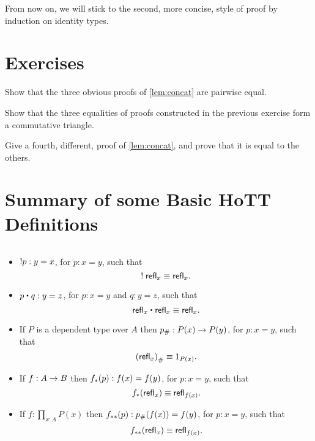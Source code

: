 From now on, we will stick to the second, more concise, style of proof by induction on identity types.


\section*{Exercises}
\label{basics:exercises}

\begin{ex}\label{ex:basics:concat}
  Show that the three obvious proofs of \autoref{lem:concat} are pairwise equal.
\end{ex}

\begin{ex}
  Show that the three equalities of proofs constructed in the previous exercise form a commutative triangle.
\end{ex}

\begin{ex}
  Give a fourth, different, proof of \autoref{lem:concat}, and prove that it is equal to the others.
\end{ex}
\section{Summary of  some Basic HoTT Definitions}
\begin{defn} $\;$
\begin{itemize}
\item $\mathord{!{p}} : y=x$, for $p:x=y$, such that 
  \[\mathord{!{\;\mathsf{refl}_{x}}}\equiv \mathsf{refl}_{x}.\]
\item $p\ct q :y=z$, for $p:x=y$ and $q:y=z$, such that 
  \[ \refl{x}\ct\refl{x}\jdeq\refl{x}.\]
\item If $P$ is a dependent type over $A$ then ${p}_{\#}:P(x)\rightarrow P(y)$, for $p:x=y$, such that 
  \[{(\mathsf{refl}_{x})}_{\#}\equiv 1_{P(x)}.\]
\item If $f:A\rightarrow B$ then ${f}_{*}\!\left({p}\right):f(x)=f(y)$, for $p:x=y$, such that   \[{f}_{*}\!\left({\mathsf{refl}_{x}}\right)\equiv \mathsf{refl}_{f(x)}.\]
\item If $f:\prod_{x:A}P(x)$ then ${f}_{**}\!\left({p}\right):{p}_{\#}\!\left({f(x)}\right)=f(y)$, for $p:x=y$, such that 
  \[{f}_{**}\!\left({\mathsf{refl}_{x}}\right)\equiv \mathsf{refl}_{f(x)}.\]


\end{itemize}
\end{defn}
